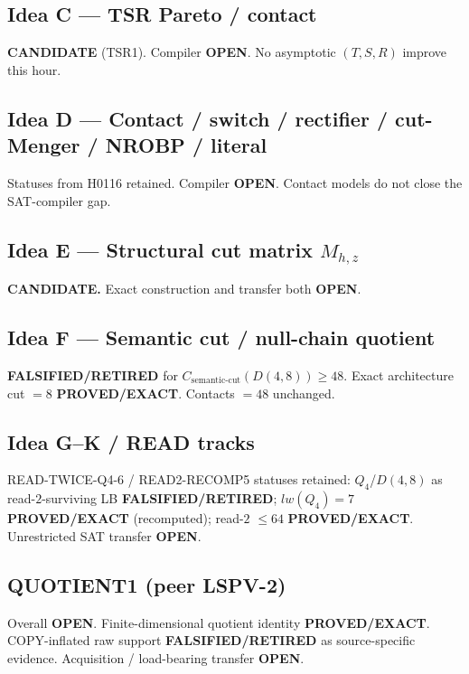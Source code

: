 \documentclass[11pt]{article}
\begin{document}
\subsection*{Idea C --- TSR Pareto / contact}
\textbf{CANDIDATE} (TSR1). Compiler \textbf{OPEN}. No asymptotic $(T,S,R)$ improve this hour.

\subsection*{Idea D --- Contact / switch / rectifier / cut-Menger / NROBP / literal}
Statuses from H0116 retained. Compiler \textbf{OPEN}. Contact models do not close the SAT-compiler gap.

\subsection*{Idea E --- Structural cut matrix $M_{h,z}$}
\textbf{CANDIDATE.} Exact construction and transfer both \textbf{OPEN}.

\subsection*{Idea F --- Semantic cut / null-chain quotient}
\textbf{FALSIFIED/RETIRED} for $C_{\mathrm{semantic\textrm{-}cut}}(D(4,8))\ge48$.
Exact architecture cut $=8$ \textbf{PROVED/EXACT}. Contacts $=48$ unchanged.

\subsection*{Idea G--K / READ tracks}
READ-TWICE-Q4-6 / READ2-RECOMP5 statuses retained: $Q_4$/$D(4,8)$ as read-$2$-surviving LB
\textbf{FALSIFIED/RETIRED}; $lw(Q_4)=7$ \textbf{PROVED/EXACT} (recomputed); read-$2$ $\le64$
\textbf{PROVED/EXACT}. Unrestricted SAT transfer \textbf{OPEN}.

\subsection*{QUOTIENT1 (peer LSPV-2)}
Overall \textbf{OPEN}. Finite-dimensional quotient identity \textbf{PROVED/EXACT}.
COPY-inflated raw support \textbf{FALSIFIED/RETIRED} as source-specific evidence.
Acquisition / load-bearing transfer \textbf{OPEN}.
\end{document}
